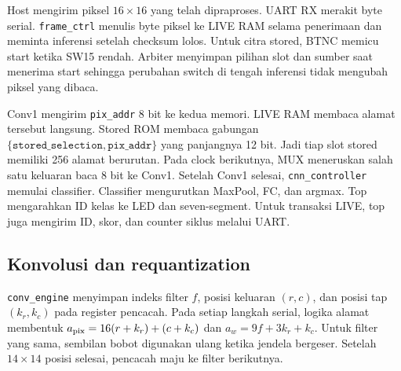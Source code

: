 Host mengirim piksel \(16\times16\) yang telah dipraproses. UART RX
merakit byte serial. \texttt{frame\_ctrl} menulis byte piksel ke LIVE
RAM selama penerimaan dan meminta inferensi setelah checksum lolos.
Untuk citra stored, BTNC memicu start ketika SW15 rendah. Arbiter
menyimpan pilihan slot dan sumber saat menerima start sehingga perubahan
switch di tengah inferensi tidak mengubah piksel yang dibaca.

Conv1 mengirim \texttt{pix\_addr} 8 bit ke kedua memori. LIVE RAM
membaca alamat tersebut langsung. Stored ROM membaca gabungan
\(\{\texttt{stored\_selection},\texttt{pix\_addr}\}\) yang panjangnya
12 bit. Jadi tiap slot stored memiliki 256 alamat berurutan. Pada clock
berikutnya, MUX meneruskan salah satu keluaran baca 8 bit ke Conv1.
Setelah Conv1 selesai, \texttt{cnn\_controller} memulai classifier.
Classifier mengurutkan MaxPool, FC, dan argmax. Top mengarahkan ID
kelas ke LED dan seven-segment. Untuk transaksi LIVE, top juga mengirim
ID, skor, dan counter siklus melalui UART.

\clearpage
\subsection{Konvolusi dan requantization}
\texttt{conv\_engine} menyimpan indeks filter \(f\), posisi keluaran
\((r,c)\), dan posisi tap \((k_r,k_c)\) pada register pencacah. Pada setiap
langkah serial, logika alamat membentuk
\(a_{\rm pix}=16(r+k_r)+(c+k_c)\) dan
\(a_w=9f+3k_r+k_c\). Untuk filter yang sama, sembilan bobot digunakan
ulang ketika jendela bergeser. Setelah \(14\times14\) posisi selesai,
pencacah maju ke filter berikutnya.

